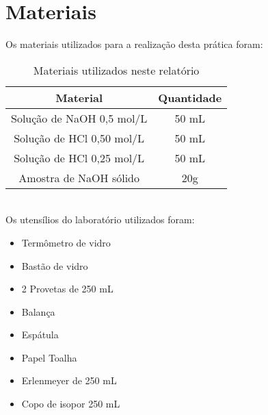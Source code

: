 
\section{Materiais}\label{sec:mat_materiais}
    \indent Os materiais utilizados para a realização desta prática foram:
        \begin{table}[h]
        \label{tab:materiais}
        \centering
        \begin{tabular}{|c|c|}
            \hline
            \textbf{Material} & \textbf{Quantidade} \\
            \hline
            Solução de NaOH 0,5 mol/L & 50 mL \\
            \hline
            Solução de HCl 0,50 mol/L & 50 mL \\
            \hline
            Solução de HCl 0,25 mol/L & 50 mL \\
            \hline
            Amostra de NaOH sólido & 20g \\
            \hline
        \end{tabular}
            \caption{Materiais utilizados neste relatório}
    \end{table}\\

    \indent Os utensílios do laboratório utilizados foram:
    \begin{itemize}
        \item Termômetro de vidro
        \item Bastão de vidro
        \item 2 Provetas de 250 mL
        \item Balança
        \item Espátula
        \item Papel Toalha
        \item Erlenmeyer de 250 mL
        \item Copo de isopor 250 mL
    \end{itemize}